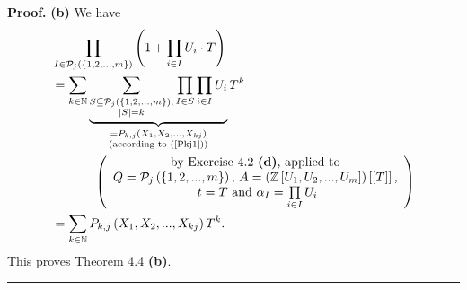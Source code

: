 \documentclass[numbers=enddot,12pt,final,onecolumn,notitlepage]{scrartcl}%
\newenvironment{proof}[1][Proof]{\noindent\textbf{#1.} }{\ \rule{0.5em}{0.5em}}
\begin{document}
\begin{proof}
\textbf{(b)} We have%
\begin{align*}
&  \prod_{I\in\mathcal{P}_{j}\left(  \left\{  1,2,...,m\right\}  \right)
}\left(  1+\prod_{i\in I}U_{i}\cdot T\right) \\
&  =\sum_{k\in\mathbb{N}}\underbrace{\sum_{\substack{S\subseteq\mathcal{P}%
_{j}\left(  \left\{  1,2,...,m\right\}  \right)  ;\\\left\vert S\right\vert
=k}}\prod_{I\in S}\prod\limits_{i\in I}U_{i}}_{\substack{=P_{k,j}\left(
X_{1},X_{2},...,X_{kj}\right)  \\\text{(according to (\ref{Pkj1}))}}}T^{k}\\
&  \ \ \ \ \ \ \ \ \ \ \left(
\begin{array}
[c]{c}%
\text{by Exercise 4.2 \textbf{(d)}, applied to}\\
Q=\mathcal{P}_{j}\left(  \left\{  1,2,...,m\right\}  \right)  \text{,
}A=\left(  \mathbb{Z}\left[  U_{1},U_{2},...,U_{m}\right]  \right)  \left[
\left[  T\right]  \right]  \text{,}\\
\text{ }t=T\text{ and }\alpha_{I}=\prod\limits_{i\in I}U_{i}%
\end{array}
\right) \\
&  =\sum_{k\in\mathbb{N}}P_{k,j}\left(  X_{1},X_{2},...,X_{kj}\right)  T^{k}.
\end{align*}
This proves Theorem 4.4 \textbf{(b)}.
\end{proof}
\end{document}
